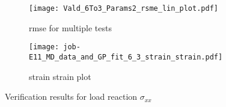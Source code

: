 \begin{figure}[H]
\centering
\begin{subfigure}[t]{0.495\textwidth}
    \centering
    \texttt{[image: Vald\_6To3\_Params2\_rsme\_lin\_plot.pdf]}
    \caption{rmse for multiple tests}
    \label{fig:verifRMSEProgress}
\end{subfigure}
\hfill
\begin{subfigure}[t]{0.495\textwidth}
    \centering
    \centering
    \texttt{[image: job-E11\_MD\_data\_and\_GP\_fit\_6\_3\_strain\_strain.pdf]}
    \caption{strain strain plot}
    \label{fig:verfiStrainStrain}
\end{subfigure}
\caption{Verification results for load reaction $\sigma_{xx}$}
\label{fig:voceAndRMSEVerif}
\end{figure}

